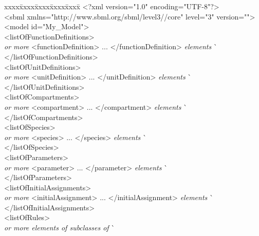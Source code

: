 \vspace*{1.5ex}
\begin{minipage}{\linewidth}
\begin{tt}
  \renewcommand{\baselinestretch}{0.82}
  \small
  \begin{tabbing}
xxxx\=xxxx\=xxxx\=xxxx\=xxxx\=\kill
\+\>
<?xml version="1.0" encoding="UTF-8"?>\\
<sbml xmlns="http://www.sbml.org/sbml/level3/\thisvlc/core" level="3" version="\sbmlversionnum">\\
\><model id="My\_Model">\\
\>\><listOfFunctionDefinitions>\\
\>\>\>\textrm{\emph{ or more}} <functionDefinition> ... </functionDefinition> \textrm{\emph{elements}}  \` \sayOptional\\
\>\></listOfFunctionDefinitions>\\
\>\><listOfUnitDefinitions>\\
\>\>\>\textrm{\emph{ or more}} <unitDefinition> ... </unitDefinition> \textrm{\emph{elements}}  \` \sayOptional\\
\>\></listOfUnitDefinitions>\\
\>\><listOfCompartments>\\
\>\>\>\textrm{\emph{ or more}} <compartment> ... </compartment> \textrm{\emph{elements}}  \` \sayOptional\\
\>\></listOfCompartments>\\
\>\><listOfSpecies>\\
\>\>\>\textrm{\emph{ or more}} <species> ... </species> \textrm{\emph{elements}}  \` \sayOptional\\
\>\></listOfSpecies>\\
\>\><listOfParameters>\\
\>\>\>\textrm{\emph{ or more}} <parameter> ... </parameter> \textrm{\emph{elements}}  \` \sayOptional\\
\>\></listOfParameters>\\
\>\><listOfInitialAssignments>\\
\>\>\>\textrm{\emph{ or more}} <initialAssignment> ... </initialAssignment> \textrm{\emph{elements}}  \` \sayOptional\\
\>\></listOfInitialAssignments>\\
\>\><listOfRules>\\
\>\>\>\textrm{\emph{ or more elements of subclasses of }}  \` \sayOptional\\

\end{tabbing}
\end{tt}
\end{minipage}
